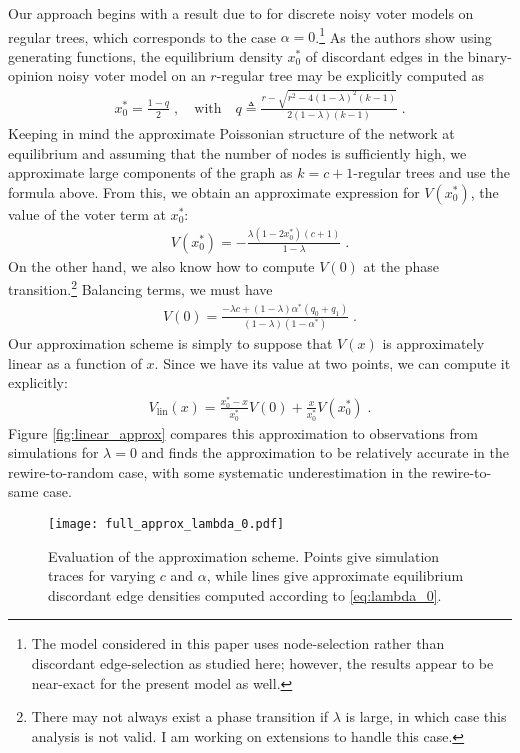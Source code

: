 \documentclass[english]{scrartcl}
\begin{document}
	Our approach begins with a result due to \cite{Allen2012} for discrete noisy voter models on regular trees, which corresponds to the case $\alpha = 0$.\footnote{The model considered in this paper uses node-selection rather than discordant edge-selection as studied here; however, the results appear to be near-exact for the present model as well.} As the authors show using generating functions, the equilibrium density $x_0^*$ of discordant edges in the binary-opinion noisy voter model on an $r$-regular tree may be explicitly computed as 
	\begin{align*}
		x_0^* = \frac{1-q}{2}\;,\quad \text{with} \quad q \triangleq \frac{r - \sqrt{r^2 - 4(1-\lambda)^2(k-1)}}{2(1-\lambda)(k-1)}\;.
	\end{align*}
	Keeping in mind the approximate Poissonian structure of the network at equilibrium and assuming that the number of nodes is sufficiently high, we approximate large components of the graph as $k = c+1$-regular trees and use the formula above. From this, we obtain an approximate expression for $V(x_0^*)$, the value of the voter term at $x_0^*$:
	\begin{align*}
		V(x_0^*) = -\frac{\lambda(1-2x_0^*)(c+1)}{1-\lambda}\;.
	\end{align*}
	On the other hand, we also know how to compute $V(0)$ at the phase transition.\footnote{There may not always exist a phase transition if $\lambda$ is large, in which case this analysis is not valid. I am working on extensions to handle this case.} Balancing terms, we must have 
	\begin{align*}
		V(0) = \frac{-\lambda c + (1-\lambda)\alpha^*(q_0 + q_1)}{(1-\lambda)(1-\alpha^*)}\;.
	\end{align*}
	Our approximation scheme is simply to suppose that $V(x)$ is approximately linear as a function of $x$. Since we have its value at two points, we can compute it explicitly: 
	\begin{align}
		V_{\text{lin}}(x) = \frac{x_0^* - x}{x_0^*}V(0) + \frac{x}{x_0^*} V(x^*_0)\label{eq:linear_approx}\;.
	\end{align}
	Figure \ref{fig:linear_approx} compares this approximation to observations from simulations for $\lambda = 0$ and finds the approximation to be relatively accurate in the rewire-to-random case, with some systematic underestimation in the rewire-to-same case. 
	
	\begin{figure}
		\centering
		\texttt{[image: full\_approx\_lambda\_0.pdf]}
		\caption{Evaluation of the approximation scheme. Points give simulation traces for varying $c$ and $\alpha$, while lines give approximate equilibrium discordant edge densities computed according to \eqref{eq:lambda_0}.} \label{fig:full_approx}
	\end{figure}
\end{document}
